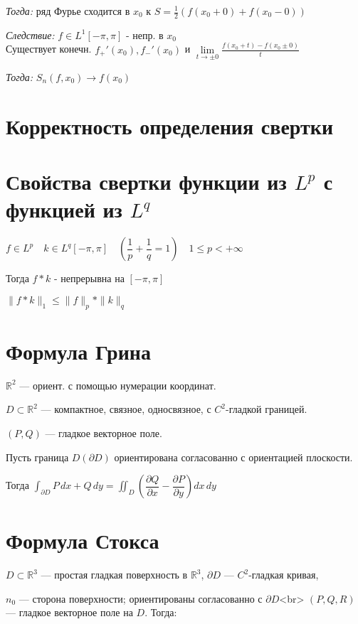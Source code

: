 \documentclass[paper=a4, fontsize=17pt]{article}
\begin{document}
\emph{Тогда:} ряд Фурье сходится в $x_0$ к $S = \frac{1}{2}(f(x_0 + 0) + f(x_0 - 0))$

\emph{Следствие:}
$f \in L^1[-\pi, \pi] $ - непр. в $x_0$\\
Существует конечн. $f_{+}'(x_0), f_{-}'(x_0)$ и $\lim\limits_{t\rightarrow \pm 0} \frac{f(x_0 + t) - f(x_0 \pm 0)}{t}$

\emph{Тогда:} $S_n(f,x_0) \rightarrow f(x_0)$
 

\section{Корректность определения свертки}
\section{Свойства свертки функции из $L^p$ с функцией из $L^q$}


$f \in L^p \quad k \in L^q[-\pi, \pi] \quad \left(\dfrac{1}{p} + \dfrac{1}{q} = 1 \right) \quad 1 \leqslant p < +\infty$

Тогда $f * k$ - непрерывна на $[-\pi, \pi]$

$\|f * k \|_1 \leqslant \|f\|_p * \|k\|_q$

\section{Формула Грина}

$\mathbb R^2$ — ориент. с помощью нумерации координат.

$D \subset \mathbb R^2$ — компактное, связное, односвязное, с $C^2$-гладкой границей.

$(P, Q)$ — гладкое векторное поле.

Пусть граница $D (\partial D)$ ориентирована согласованно с ориентацией плоскости.

Тогда $\displaystyle\int_{\partial D} P \,dx + Q \,dy = \displaystyle\iint_D \left(\dfrac{\partial Q}{\partial x} - \dfrac{\partial P}{\partial y}\right) dx\, dy$

\section{Формула Стокса}

$D \subset \mathbb R^3$ — простая гладкая поверхность в $\mathbb R^3$,
$\partial D$ — $C^2$-гладкая кривая,

$n_0$ — сторона поверхности; ориентированы согласованно с $\partial D$<br>
$(P,Q,R)$ — гладкое векторное поле на $D$. Тогда:
\end{document}
